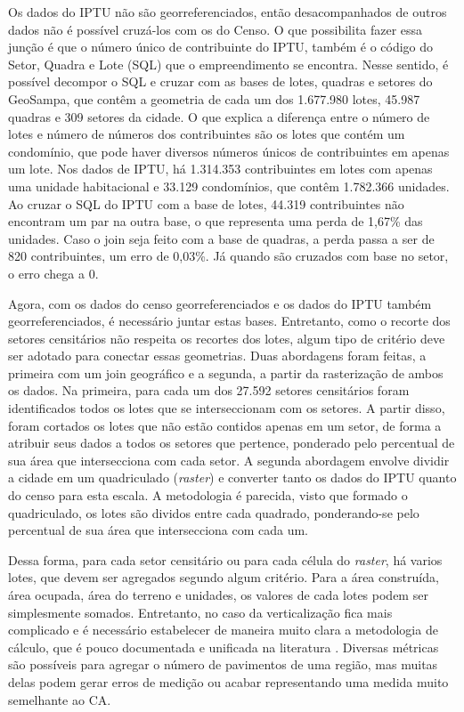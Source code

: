Os dados do IPTU não são georreferenciados, então desacompanhados de outros dados não é possível cruzá-los com os do Censo. O que possibilita fazer essa junção é que o número único de contribuinte do IPTU, também é o código do Setor, Quadra e Lote (SQL) que o empreendimento se encontra. Nesse sentido, é possível decompor o SQL e cruzar com as bases de lotes, quadras e setores do GeoSampa, que contêm a geometria de cada  um dos 1.677.980 lotes, 45.987 quadras e 309 setores da cidade. O que explica a diferença entre o número de lotes e número de números dos contribuintes são os lotes que contém um condomínio, que pode haver diversos números únicos de contribuintes em apenas um lote. Nos dados de IPTU, há 1.314.353 contribuintes em lotes com apenas uma unidade habitacional e 33.129 condomínios, que contêm 1.782.366 unidades. Ao cruzar o SQL do IPTU com a base de lotes, 44.319 contribuintes não encontram um par na outra base, o que representa uma perda de 1,67\% das unidades. Caso o join seja feito com a base de quadras, a perda passa a ser de 820 contribuintes, um erro de 0,03\%. Já quando são cruzados com base no setor, o erro chega a 0.

Agora, com os dados do censo georreferenciados e os dados do IPTU também georreferenciados, é necessário juntar estas bases. Entretanto, como o recorte dos setores censitários não respeita os recortes dos lotes, algum tipo de critério deve ser adotado para conectar essas geometrias. Duas abordagens foram feitas, a primeira com um join geográfico e a segunda, a partir da rasterização de ambos os dados. Na primeira, para cada um dos 27.592 setores censitários foram identificados todos os lotes que se interseccionam com os setores. A partir disso, foram cortados os lotes que não estão contidos apenas em um setor, de forma a atribuir seus dados a todos os setores que pertence, ponderado pelo percentual de sua área que intersecciona com cada setor. A segunda abordagem envolve dividir a cidade em um quadriculado (\textit{raster}) e converter tanto os dados do IPTU quanto do censo para esta escala. A metodologia é parecida, visto que formado o quadriculado, os lotes são dividos entre cada quadrado, ponderando-se pelo percentual de sua área que intersecciona com cada um.

Dessa forma, para cada setor censitário ou para cada célula do \textit{raster}, há varios lotes, que devem ser agregados segundo algum critério. Para a área construída, área ocupada, área do terreno e unidades, os valores de cada lotes podem ser simplesmente somados. Entretanto, no caso da verticalização fica mais complicado e é necessário estabelecer de maneira muito clara a metodologia de cálculo, que é pouco documentada e unificada na literatura \cite{ccalicskan2022morphological}. Diversas métricas são possíveis para agregar o número de pavimentos de uma região, mas muitas delas podem gerar erros de medição ou acabar representando uma medida muito semelhante ao CA.

